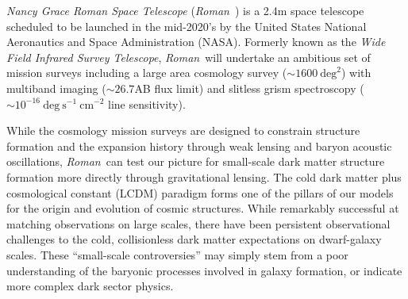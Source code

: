 \documentclass[11pt]{article}
\newcommand{\RST}{\emph{Roman}~}
\begin{document}
\clearpage


\emph{Nancy Grace Roman Space Telescope} (\RST) is a 2.4m space telescope scheduled 
to be launched in the
mid-2020's by the United States National Aeronautics and Space Administration (NASA)\citep{spergel2015a,akeson2019a}.
Formerly known as the \emph{Wide Field Infrared Survey Telescope}, \RST will undertake
an ambitious set of mission surveys including a large area cosmology survey ($\sim 1600~\mathrm{deg}^2$)
with multiband imaging ($\sim26.7$AB flux limit) and slitless grism spectroscopy ($\sim10^{-16}~\mathrm{deg}~\mathrm{s}^{-1}~\mathrm{cm}^{-2}$ line sensitivity).

While the cosmology mission surveys are designed to constrain structure formation and the
expansion history through weak lensing and baryon acoustic oscillations, 
\RST can test our picture for small-scale dark matter structure formation more
directly through gravitational lensing. The cold dark matter plus cosmological constant (LCDM)
paradigm forms one of the pillars of our models for the origin and evolution of cosmic structures.
While remarkably successful at matching observations on large scales, there have been persistent
observational challenges to the cold, collisionless dark matter expectations on dwarf-galaxy
scales. These “small-scale controversies” may simply stem from a poor understanding of the
baryonic processes involved in galaxy formation, or indicate more complex dark sector physics.
\end{document}
